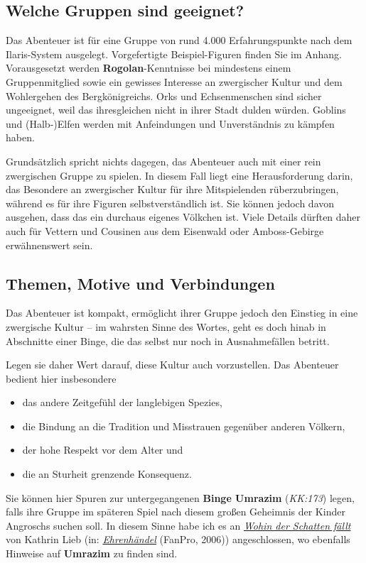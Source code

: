 \subsection*{Welche Gruppen sind geeignet?}
Das Abenteuer ist für eine Gruppe von rund 4.000 Erfahrungspunkte nach dem Ilaris-System ausgelegt. Vorgefertigte Beispiel-Figuren finden Sie im Anhang.
Vorausgesetzt werden \textbf{Rogolan}-Kenntnisse bei mindestens einem Gruppenmitglied sowie ein gewisses Interesse an zwergischer Kultur und dem Wohlergehen des Bergkönigreichs.
Orks und Echsenmenschen sind sicher ungeeignet, weil das \fkv ihresgleichen nicht in ihrer Stadt dulden würden.
Goblins und (Halb-)Elfen werden mit Anfeindungen und Unverständnis zu kämpfen haben.

Grundsätzlich spricht nichts dagegen, das Abenteuer auch mit einer rein zwergischen Gruppe zu spielen.
In diesem Fall liegt eine Herausforderung darin,  das Besondere an zwergischer Kultur für ihre Mitspielenden rüberzubringen,
während es für ihre Figuren selbstverständlich ist.
Sie können jedoch davon ausgehen, dass das \fkv ein durchaus eigenes Völkchen ist.
Viele Details dürften daher auch für  Vettern und Cousinen aus dem Eisenwald oder Amboss-Gebirge erwähnenswert sein.

\subsection*{Themen, Motive und Verbindungen}
Das Abenteuer ist kompakt, ermöglicht  ihrer Gruppe jedoch den Einstieg in eine zwergische Kultur
-- im wahrsten Sinne des Wortes, geht es doch hinab in Abschnitte einer Binge,
die das \fkv selbst nur noch in  Ausnahmefällen betritt.

Legen sie daher Wert darauf, diese Kultur auch vorzustellen. Das Abenteuer bedient hier insbesondere
\begin{itemize}
	\item das andere Zeitgefühl der langlebigen Spezies,
	\item die Bindung an die Tradition und Misstrauen gegenüber anderen Völkern,
	\item der hohe Respekt vor dem Alter und
	\item die an Sturheit grenzende Konsequenz.
\end{itemize}

Sie können hier  Spuren zur untergegangenen \textbf{Binge Umrazim} (\emph{KK:173}) legen,
falls ihre Gruppe im späteren Spiel nach diesem großen Geheimnis der Kinder Angroschs suchen soll.
In diesem Sinne habe ich es an \emph{\href{https://de.wiki-aventurica.de/wiki/Wohin_der_Schatten_fällt}{Wohin der Schatten fällt}} von Kathrin Lieb (in: \emph{\href{https://de.wiki-aventurica.de/wiki/Ehrenhändel}{Ehrenhändel}} (FanPro, 2006)) angeschlossen,
wo ebenfalls Hinweise auf \textbf{Umrazim} zu finden sind.

